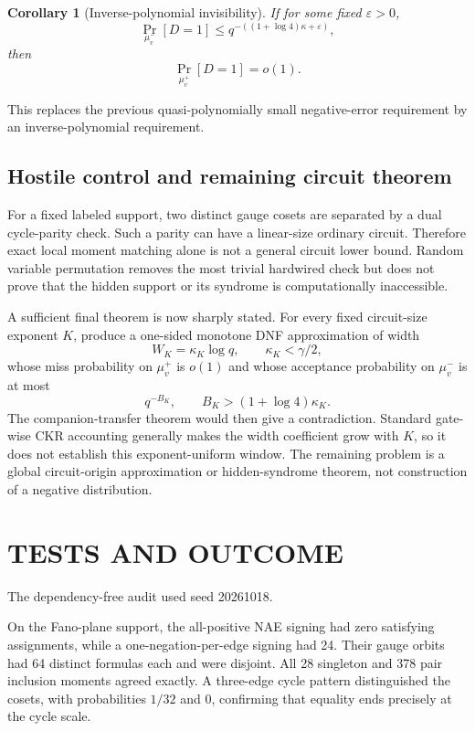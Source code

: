 \documentclass[11pt]{article}
\newtheorem{corollary}[theorem]{Corollary}
\begin{document}
\begin{corollary}[Inverse-polynomial invisibility]
If for some fixed $\varepsilon>0$,
\[
\Pr_{\mu_v^-}[D=1]
\le q^{-((1+\log4)\kappa+\varepsilon)},
\]
then
\[
\Pr_{\mu_v^+}[D=1]=o(1).
\]
\end{corollary}

This replaces the previous quasi-polynomially small negative-error requirement by an inverse-polynomial requirement.

\subsection{Hostile control and remaining circuit theorem}
For a fixed labeled support, two distinct gauge cosets are separated by a dual cycle-parity check. Such a parity can have a linear-size ordinary circuit. Therefore exact local moment matching alone is not a general circuit lower bound. Random variable permutation removes the most trivial hardwired check but does not prove that the hidden support or its syndrome is computationally inaccessible.

A sufficient final theorem is now sharply stated. For every fixed circuit-size exponent $K$, produce a one-sided monotone DNF approximation of width
\[
W_K=\kappa_K\log q,
\qquad \kappa_K<\gamma/2,
\]
whose miss probability on $\mu_v^+$ is $o(1)$ and whose acceptance probability on $\mu_v^-$ is at most
\[
q^{-B_K},
\qquad B_K>(1+\log4)\kappa_K.
\]
The companion-transfer theorem would then give a contradiction. Standard gate-wise CKR accounting generally makes the width coefficient grow with $K$, so it does not establish this exponent-uniform window. The remaining problem is a global circuit-origin approximation or hidden-syndrome theorem, not construction of a negative distribution.

\section{TESTS AND OUTCOME}
The dependency-free audit used seed 20261018.

On the Fano-plane support, the all-positive NAE signing had zero satisfying assignments, while a one-negation-per-edge signing had 24. Their gauge orbits had 64 distinct formulas each and were disjoint. All 28 singleton and 378 pair inclusion moments agreed exactly. A three-edge cycle pattern distinguished the cosets, with probabilities $1/32$ and $0$, confirming that equality ends precisely at the cycle scale.
\end{document}

